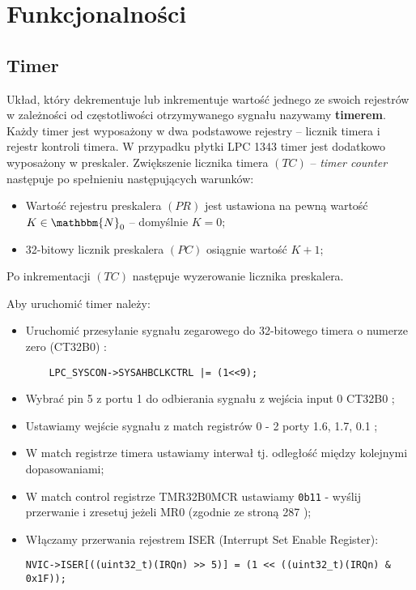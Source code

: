 \documentclass[a4paper,12pt,twoside]{article}
\newcommand{\N}{\mathbbm{N}}
\theoremstyle{plain}
\theoremstyle{definition}
\theoremstyle{remark}
\begin{document}
\section{Funkcjonalności}
\subsection{Timer}
Układ, który dekrementuje lub inkrementuje wartość jednego ze swoich rejestrów w zależności od częstotliwości otrzymywanego sygnału nazywamy \textbf{timerem}. Każdy timer jest wyposażony w dwa podstawowe rejestry -- licznik timera i rejestr kontroli timera. W przypadku płytki LPC 1343 timer jest dodatkowo wyposażony w preskaler. Zwiększenie licznika timera $(TC)$ -- \textit{timer counter} następuje po spełnieniu następujących warunków:
\begin{itemize}
\item Wartość rejestru preskalera $(PR)$ jest ustawiona na pewną wartość $K\in \N_0$ -- domyślnie $K=0$;
\item 32-bitowy licznik preskalera $(PC)$ osiągnie wartość $K+1$;
\end{itemize}
Po inkrementacji $(TC)$ następuje wyzerowanie licznika preskalera.

Aby uruchomić timer należy:
\begin{itemize}
	\item Uruchomić przesyłanie sygnału zegarowego do 32-bitowego timera o numerze zero (CT32B0) \cite{INST}: 
	\begin{verbatim}
	LPC_SYSCON->SYSAHBCLKCTRL |= (1<<9);
	\end{verbatim}
	\item Wybrać pin 5 z portu 1 do odbierania sygnału z wejścia input 0 CT32B0 ;
	\item Ustawiamy wejście sygnału z match registrów 0 - 2 porty 1.6, 1.7, 0.1 ;
	\item W match registrze timera ustawiamy interwał tj. odległość między kolejnymi dopasowaniami;
	\item W match control registrze TMR32B0MCR ustawiamy \verb|0b11| - wyślij przerwanie i zresetuj jeżeli MR0 (zgodnie ze stroną 287 \cite{INST});
	\item Włączamy przerwania rejestrem ISER (Interrupt Set Enable Register):
\begin{verbatim}
NVIC->ISER[((uint32_t)(IRQn) >> 5)] = (1 << ((uint32_t)(IRQn) & 0x1F));
\end{verbatim}
\end{itemize}
\end{document}
